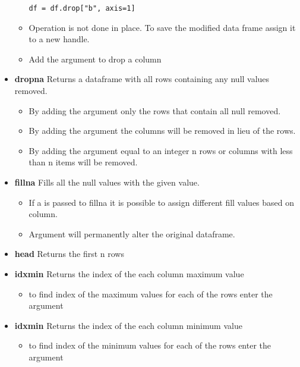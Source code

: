 \begin{itemize}
\begin{itemize}
\begin{lstlisting}
df = df.drop["b", axis=1]
\end{lstlisting}
      \item Operation is not done in place.  To save the modified data frame
        assign it to a new handle.
      \item Add the argument \color{red}{axis=1} to drop a column
    \end{itemize}
  \item \textbf{dropna} Returns a dataframe with all rows containing any null
    values removed.
    \begin{itemize}
      \item By adding the argument {\color{red}{how='all'}} only the rows that
        contain all null removed.
      \item By adding the argument {\color{red}{axis=1}} the columns will be
        removed in lieu of the rows.
      \item By adding the argument {\color{red}{thresh}} equal to an integer n
        rows or columns with less than n items will be removed.
    \end{itemize}
  \item \textbf{fillna} Fills all the null values with the given value.
    \begin{itemize}
      \item If a {\color{red}{dictionary}} is passed to fillna it is possible
        to assign different fill values based on column.
      \item Argument {\color{red}{inplace=True}} will permanently alter the
        original dataframe.
    \end{itemize}
  \item \textbf{head} Returns the first n rows
  \item \textbf{idxmin} Returns the index of the each column maximum value
    \begin{itemize}
      \item to find index of the maximum values for each of the rows enter
        the argument \color{red}{axis=1}
    \end{itemize}
  \item \textbf{idxmin} Returns the index of the each column minimum value
    \begin{itemize}
      \item to find index of the minimum values for each of the rows enter
        the argument \color{red}{axis=1}
    \end{itemize}

\end{itemize}
